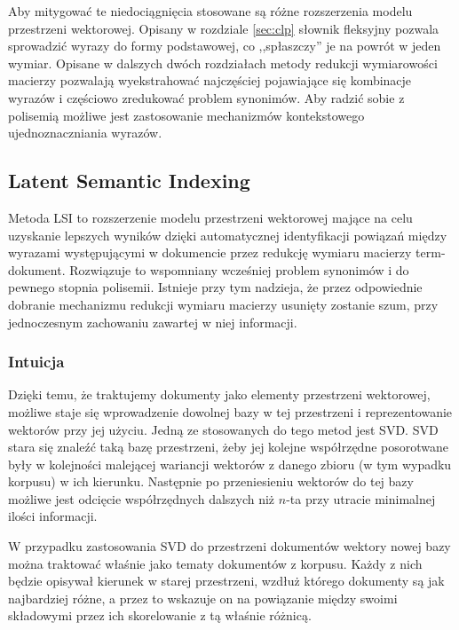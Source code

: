 \documentclass[11pt,a4paper]{article}
\begin{document}
Aby mitygować te niedociągnięcia stosowane są różne rozszerzenia modelu
przestrzeni wektorowej. Opisany w rozdziale \ref{sec:clp} słownik fleksyjny
pozwala sprowadzić wyrazy do formy podstawowej, co ,,spłaszczy'' je na powrót w
jeden wymiar. Opisane w dalszych dwóch rozdziałach metody redukcji wymiarowości
macierzy pozwalają wyekstrahować najczęściej pojawiające się kombinacje
wyrazów i częściowo zredukować problem synonimów. Aby radzić sobie z polisemią
możliwe jest zastosowanie mechanizmów kontekstowego ujednoznaczniania wyrazów.

\FloatBarrier

\subsection{Latent Semantic Indexing}

Metoda LSI to rozszerzenie modelu przestrzeni wektorowej mające na celu
uzyskanie lepszych wyników dzięki automatycznej identyfikacji powiązań między
wyrazami występującymi w dokumencie przez redukcję wymiaru macierzy
term-dokument. Rozwiązuje to wspomniany wcześniej problem synonimów i do
pewnego stopnia polisemii.  Istnieje przy tym nadzieja, że przez odpowiednie
dobranie mechanizmu redukcji wymiaru macierzy usunięty zostanie szum, przy
jednoczesnym zachowaniu zawartej w niej informacji.

\subsubsection{Intuicja}

Dzięki temu, że traktujemy dokumenty jako elementy przestrzeni wektorowej,
możliwe staje się wprowadzenie dowolnej bazy w tej przestrzeni i
reprezentowanie wektorów przy jej użyciu. Jedną ze stosowanych do tego metod
jest SVD. SVD stara się znaleźć taką bazę przestrzeni, żeby jej kolejne
współrzędne posorotwane były w kolejności malejącej wariancji wektorów z danego
zbioru (w tym wypadku korpusu) w ich kierunku. Następnie po przeniesieniu
wektorów do tej bazy możliwe jest odcięcie współrzędnych dalszych niż $n$-ta
przy utracie minimalnej ilości informacji.

W przypadku zastosowania SVD do przestrzeni dokumentów wektory nowej bazy można
traktować właśnie jako tematy dokumentów z korpusu. Każdy z nich będzie
opisywał kierunek w starej przestrzeni, wzdłuż którego dokumenty są jak
najbardziej różne, a przez to wskazuje on na powiązanie między swoimi
składowymi przez ich skorelowanie z tą właśnie różnicą.
\end{document}
